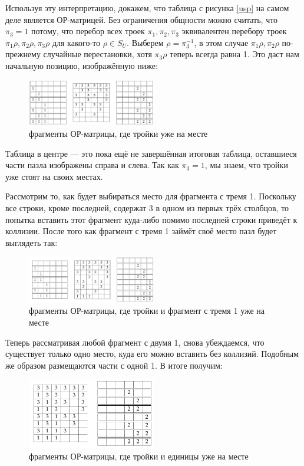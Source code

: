 Используя эту интерпретацию, докажем, что таблица с рисунка \ref{usp} на самом деле является ОР-матрицей. Без ограничения общности можно считать, что $\pi_3 = 1$ потому, что перебор всех троек $\pi_1, \pi_2, \pi_3$ эквивалентен перебору троек $\pi_1 \rho, \pi_2 \rho, \pi_3 \rho$ для какого-то $\rho \in S_U$. Выберем $\rho = \pi_3^{-1}$, в этом случае $\pi_1 \rho, \pi_2 \rho$ по-прежнему случайные перестановки, хотя $\pi_3 \rho$ теперь всегда равна 1. Это даст нам начальную позицию, изображённую ниже:
\begin{figure}[H]
	\centering
    \includegraphics[width=0.5\textwidth]{figures/usp_threes_placed}
	\caption{фрагменты ОР-матрицы, где тройки уже на месте}
	\label{usp:fig3.3}
\end{figure}
Таблица в центре --- это пока ещё не завершённая итоговая таблица, оставшиеся части пазла изображены справа и слева. Так как $\pi_3 = 1$, мы знаем, что тройки уже стоят на своих местах.

Рассмотрим то, как будет выбираться место для фрагмента с тремя 1. Поскольку все строки, кроме последней, содержат 3 в одном из первых трёх столбцов, то попытка вставить этот фрагмент куда-либо помимо последней строки приведёт к коллизии. После того как фрагмент с тремя 1 займёт своё место пазл будет выглядеть так:
\begin{figure}[H]
	\centering
    \includegraphics[width=0.5\textwidth]{figures/usp_threes_and_first_piece_placed}
	\caption{фрагменты ОР-матрицы, где тройки и фрагмент с тремя 1 уже на месте}
	\label{usp:fig3.4}
\end{figure}

Теперь рассматривая любой фрагмент с двумя 1, снова убеждаемся, что существует только одно место, куда его можно вставить без коллизий. Подобным же образом размещаются части с одной 1. В итоге получим:
\begin{figure}[H]
	\centering
    \includegraphics[width=0.5\textwidth]{figures/usp_threes_and_ones_placed.png}
	\caption{фрагменты ОР-матрицы, где тройки и единицы уже на месте}
	\label{usp:fig3.5}
\end{figure}

